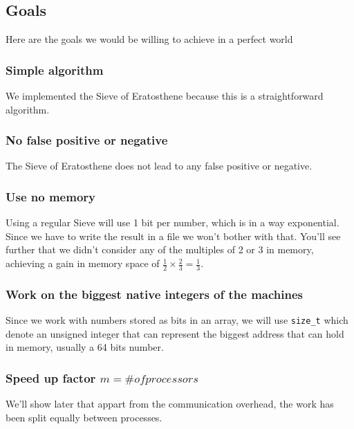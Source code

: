 \subsection{Goals}

Here are the goals we would be willing to achieve in a perfect world

\subsubsection{Simple algorithm}
We implemented the Sieve of Eratosthene because this is a straightforward algorithm.
\subsubsection{No false positive or negative}
The Sieve of Eratosthene does not lead to any false positive or negative.
\subsubsection{Use no memory}
Using a regular Sieve will use 1 bit per number, which is in a way exponential. Since we have to write the result in a file we won't bother with that. You'll see further that we didn't consider any of the multiples of 2 or 3 in memory, achieving a gain in memory space of $\frac{1}{2}\times\frac{2}{3} = \frac{1}{3}$.
\subsubsection{Work on the biggest native integers of the machines}
Since we work with numbers stored as bits in an array, we will use \verb+size_t+ which denote an unsigned integer that can represent the biggest address that can hold in memory, usually a 64 bits number.
\subsubsection{Speed up factor $m = \# of processors$}
We'll show later that appart from the communication overhead, the work has been split equally between processes.





